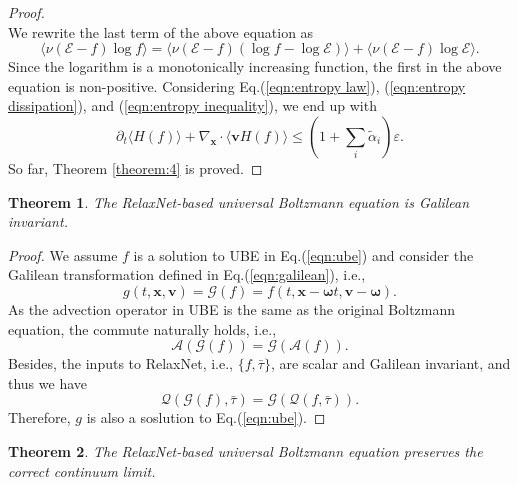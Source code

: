 \documentclass[preprint,3p,12pt,sort&compress]{elsarticle}
\newtheorem{theorem}{Theorem}
\begin{document}
\begin{proof}
\begin{equation}
\end{equation}
We rewrite the last term of the above equation as
\begin{equation}
    \langle \nu (\mathcal E - f)\log f \rangle = \langle \nu (\mathcal E - f)(\log f - \log \mathcal E) \rangle +  \langle \nu (\mathcal E - f)\log \mathcal E \rangle.
    \label{eqn:entropy inequality}
\end{equation}
Since the logarithm is a monotonically increasing function, the first in the above equation is non-positive.
Considering Eq.(\ref{eqn:entropy law}), (\ref{eqn:entropy dissipation}), and (\ref{eqn:entropy inequality}), we end up with
\begin{equation}
    \partial_t \langle H(f) \rangle + \nabla_\mathbf x \cdot \langle \mathbf v H(f) \rangle \leq \left( 1 + \sum_i \tilde\alpha_i \right) \varepsilon.
\end{equation}
So far, Theorem \ref{theorem:4} is proved.
\end{proof}

\begin{theorem}\label{theorem:5}
The RelaxNet-based universal Boltzmann equation is Galilean invariant.
\end{theorem}

\begin{proof}
We assume $f$ is a solution to UBE in Eq.(\ref{eqn:ube}) and consider the Galilean transformation defined in Eq.(\ref{eqn:galilean}), i.e.,
\begin{equation}
    g(t,\mathbf x,\mathbf v) = \mathcal G(f)=f(t,\mathbf x-\boldsymbol\omega t,\mathbf v-\boldsymbol\omega).
\end{equation}
As the advection operator in UBE is the same as the original Boltzmann equation, the commute naturally holds, i.e.,
\begin{equation}
    \mathcal A(\mathcal G(f)) = \mathcal G(\mathcal A(f)).
\end{equation}
Besides, the inputs to RelaxNet, i.e., $\{f,\bar\tau\}$, are scalar and Galilean invariant, and thus we have
\begin{equation}
    \mathcal Q(\mathcal G(f),\bar\tau) = \mathcal G(\mathcal Q(f,\bar\tau)).
\end{equation}
Therefore, $g$ is also a soslution to Eq.(\ref{eqn:ube}).
\end{proof}

\begin{theorem}\label{theorem:6}
The RelaxNet-based universal Boltzmann equation preserves the correct continuum limit.
\end{theorem}
\end{document}
